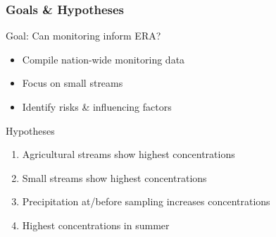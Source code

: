 \documentclass[
	10pt
	]{beamer}
\begin{document}
\begin{frame}
\frametitle{Goals \& Hypotheses}
	\begin{exampleblock}{Goal: Can monitoring inform ERA?}
		\begin{itemize}
			\item Compile nation-wide monitoring data %
			\item Focus on small streams %
			\item Identify risks \& influencing factors
		\end{itemize}
	\end{exampleblock}
	\pause
	\begin{exampleblock}{Hypotheses}
		\begin{enumerate}
			\item Agricultural streams show highest concentrations
			\item Small streams show highest concentrations
			\item Precipitation at/before sampling increases concentrations
			\item Highest concentrations in summer
		\end{enumerate}
	\end{exampleblock}
\end{frame}
\end{document}

